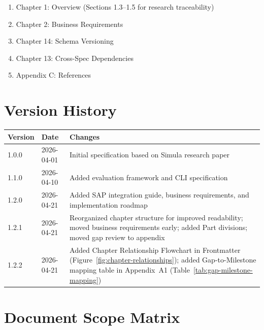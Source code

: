 \begin{tcolorbox}[colback=gray!5,colframe=gray!50,title=\faIcon{gavel} For Auditors / Compliance Officers]
\begin{enumerate}
    \item Chapter 1: Overview (Sections 1.3--1.5 for research traceability)
    \item Chapter 2: Business Requirements
    \item Chapter 14: Schema Versioning
    \item Chapter 13: Cross-Spec Dependencies
    \item Appendix C: References
\end{enumerate}
\end{tcolorbox}

\section*{Version History}

\begin{longtable}{@{}llp{8cm}@{}}
\toprule
\textbf{Version} & \textbf{Date} & \textbf{Changes} \\
\midrule
\endhead
1.0.0 & 2026-04-01 & Initial specification based on Simula research paper \\
1.1.0 & 2026-04-10 & Added evaluation framework and CLI specification \\
1.2.0 & 2026-04-21 & Added SAP integration guide, business requirements, and implementation roadmap \\
1.2.1 & 2026-04-21 & Reorganized chapter structure for improved readability; moved business requirements early; added Part divisions; moved gap review to appendix \\
1.2.2 & 2026-04-21 & Added Chapter Relationship Flowchart in Frontmatter (Figure~\ref{fig:chapter-relationships}); added Gap-to-Milestone mapping table in Appendix~A1 (Table~\ref{tab:gap-milestone-mapping}) \\
\bottomrule
\end{longtable}

\section*{Document Scope Matrix}

